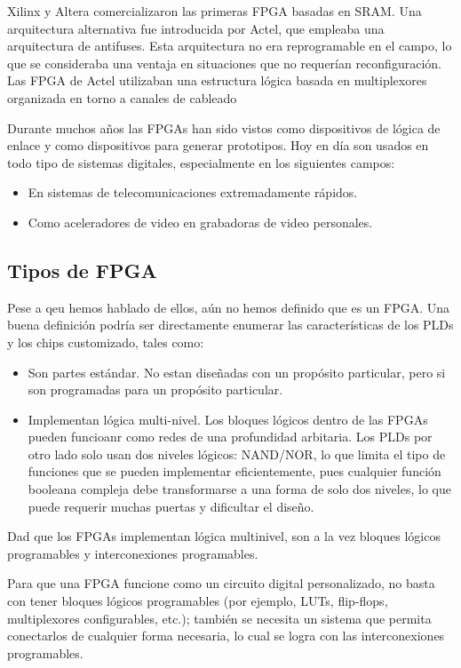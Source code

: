 Xilinx y Altera comercializaron las primeras FPGA basadas en SRAM. Una arquitectura alternativa fue introducida por Actel, que empleaba una arquitectura de antifuses. Esta arquitectura no era reprogramable en el campo, lo que se consideraba una ventaja en situaciones que no requerían reconfiguración. Las FPGA de Actel utilizaban una estructura lógica basada en multiplexores organizada en torno a canales de cableado

Durante muchos años las FPGAs han sido vistos como dispositivos de lógica de enlace y como dispositivos para generar prototipos. Hoy en día son usados en todo tipo de sistemas digitales, especialmente en los siguientes campos:
\begin{itemize}
    \item En sistemas de telecomunicaciones extremadamente rápidos.
    \item Como aceleradores de video en grabadoras de video personales.
\end{itemize}

\subsection{Tipos de FPGA}

Pese a qeu hemos hablado de ellos, aún no hemos definido que es un FPGA. Una buena definición podría ser directamente enumerar las características de los PLDs  y los chips customizado, tales como:

\begin{itemize}
    \item Son partes estándar. No estan diseñadas con un propósito particular, pero si son programadas para un propósito particular.
    \item Implementan lógica multi-nivel. Los bloques lógicos dentro de las FPGAs pueden funcioanr como redes de una profundidad arbitaria. Los PLDs por otro lado solo usan dos niveles lógicos: NAND/NOR, lo que limita el tipo de funciones que se pueden implementar eficientemente, pues cualquier función booleana compleja debe transformarse a una forma de solo dos niveles, lo que puede requerir muchas puertas y dificultar el diseño. 
\end{itemize}
Dad que los FPGAs implementan lógica multinivel, son  a la vez bloques lógicos programables y interconexiones programables. 

Para que una FPGA funcione como un circuito digital personalizado, no basta con tener bloques lógicos programables (por ejemplo, LUTs, flip-flops, multiplexores configurables, etc.); también se necesita un sistema que permita conectarlos de cualquier forma necesaria, lo cual se logra con las interconexiones programables.

